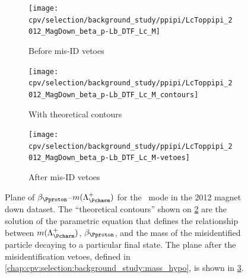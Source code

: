 \begin{figure}
  \begin{subfigure}[b]{0.5\textwidth}
    \texttt{[image: cpv/selection/background\_study/ppipi/LcToppipi\_2012\_MagDown\_beta\_p-Lb\_DTF\_Lc\_M]}
    \caption{Before mis-ID vetoes}
    \label{fig:cpv:selection:background_study:mom_asym:ppipi:before}
  \end{subfigure}
  \begin{subfigure}[b]{0.5\textwidth}
    \texttt{[image: cpv/selection/background\_study/ppipi/LcToppipi\_2012\_MagDown\_beta\_p-Lb\_DTF\_Lc\_M\_contours]}
    \caption{With theoretical contours}
    \label{fig:cpv:selection:background_study:mom_asym:ppipi:contours}
  \end{subfigure}
  \begin{subfigure}[b]{0.5\textwidth}
    \texttt{[image: cpv/selection/background\_study/ppipi/LcToppipi\_2012\_MagDown\_beta\_p-Lb\_DTF\_Lc\_M-vetoes]}
    \caption{After mis-ID vetoes}
    \label{fig:cpv:selection:background_study:mom_asym:ppipi:after}
  \end{subfigure}
  \caption{%
    Plane of $\beta_{\Pproton}$--$m(\PLambdac)$ for the \ppipi\ mode in the 
    2012 magnet down dataset.
    The ``theoretical contours'' shown on 
    \cref{fig:cpv:selection:background_study:mom_asym:ppipi:contours} are the 
    solution of the parametric equation that defines the relationship between 
    $m(\PLambdac)$, $\beta_{\Pproton}$, and the mass of the misidentified 
    particle decaying to a particular final state.
    The plane after the misidentification vetoes, defined in 
    \cref{chap:cpv:selection:background_study:mass_hypo}, is shown in 
    \cref{fig:cpv:selection:background_study:mom_asym:ppipi:after}.
  }
  \label{fig:cpv:selection:background_study:mom_asym:ppipi}
\end{figure}

